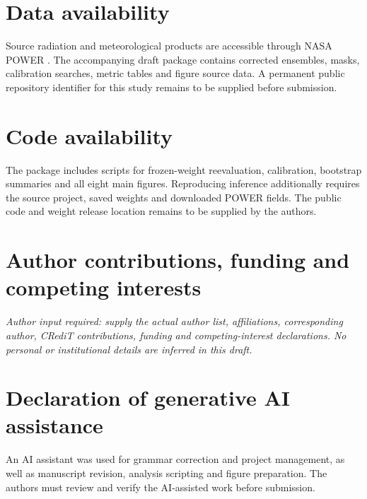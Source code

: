 \documentclass[preprint,12pt,authoryear]{elsarticle}
\begin{document}
\section*{Data availability}
Source radiation and meteorological products are accessible through NASA POWER \citep{powerdaily}. The accompanying draft package contains corrected ensembles, masks, calibration searches, metric tables and figure source data. A permanent public repository identifier for this study remains to be supplied before submission.
\section*{Code availability}
The package includes scripts for frozen-weight reevaluation, calibration, bootstrap summaries and all eight main figures. Reproducing inference additionally requires the source project, saved weights and downloaded POWER fields. The public code and weight release location remains to be supplied by the authors.
\section*{Author contributions, funding and competing interests}
\textit{Author input required: supply the actual author list, affiliations, corresponding author, CRediT contributions, funding and competing-interest declarations. No personal or institutional details are inferred in this draft.}
\section*{Declaration of generative AI assistance}
An AI assistant was used for grammar correction and project management, as well as manuscript revision, analysis scripting and figure preparation. The authors must review and verify the AI-assisted work before submission.
\end{document}
